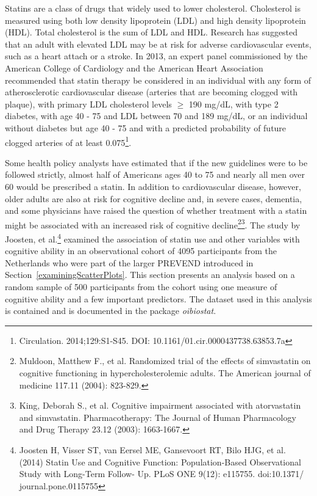 Statins are a class of drugs that widely used to lower cholesterol. Cholesterol is measured using both low density lipoprotein (LDL) and high density lipoprotein (HDL).  Total cholesterol is the sum of LDL and HDL.  Research has suggested that an adult with elevated LDL may be at risk for adverse cardiovascular events, such as a heart attach or a stroke.  In 2013, an expert panel commissioned by the American College of Cardiology and the American Heart Association recommended that statin therapy be considered in an individual with any form of atherosclerotic cardiovascular disease (arteries that are becoming clogged with plaque), with primary LDL cholesterol levels $\ge$ 190 mg/dL, with type 2 diabetes, with age 40 - 75 and LDL between 70 and 189 mg/dL, or an individual without diabetes but age 40 - 75 and with a predicted probability of future clogged arteries of at least 0.075\footnote{Circulation. 2014;129:S1-S45. DOI: 10.1161/01.cir.0000437738.63853.7a}.

Some health policy analysts have estimated that if the new guidelines were to be followed strictly, almost half of Americans ages 40 to 75 and nearly all men over 60 would be prescribed a statin. In addition to cardiovascular disease, however, older adults are also at risk for cognitive decline and, in severe cases, dementia, and some physicians have raised the question of whether treatment with a statin might be associated with an increased risk of cognitive decline\footnote{Muldoon, Matthew F., et al. Randomized trial of the effects of simvastatin on cognitive functioning in hypercholesterolemic adults. The American journal of medicine 117.11 (2004): 823-829.}\footnote{King, Deborah S., et al. Cognitive impairment associated with atorvastatin and simvastatin. Pharmacotherapy: The Journal of Human Pharmacology and Drug Therapy 23.12 (2003): 1663-1667.}.  The study by Joosten, et al.\footnote{Joosten H, Visser ST, van Eersel ME, Gansevoort RT, Bilo HJG, et al. (2014) Statin Use and Cognitive Function: Population-Based Observational Study with Long-Term Follow- Up. PLoS ONE 9(12): e115755. doi:10.1371/ journal.pone.0115755} examined the association of statin use and other variables with cognitive ability in an observational cohort of 4095 participants from the Netherlands who were part of the larger PREVEND introduced in Section~\ref{examiningScatterPlots}.  This section presents an analysis based on a random sample of 500 participants from the cohort using one measure of cognitive ability and a few important predictors.  The dataset  used in this analysis is contained and is documented in the package \textit{oibiostat}.

